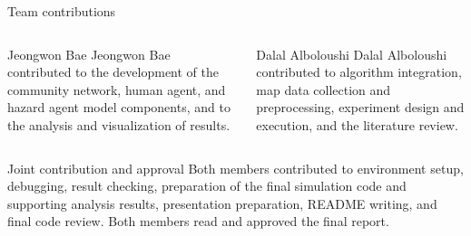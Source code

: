 \documentclass[aspectratio=169, xcolor=table]{beamer}
\begin{document}
\begin{frame}[t]{Team contributions}
\footnotesize

\begin{columns}[T,onlytextwidth]
\begin{block}{\small Jeongwon Bae}
\scriptsize
Jeongwon Bae contributed to the development of the community network, human agent, and hazard agent model components, and to the analysis and visualization of results.
\end{block}

\begin{block}{\small Dalal Alboloushi}
\scriptsize
Dalal Alboloushi contributed to algorithm integration, map data collection and preprocessing, experiment design and execution, and the literature review.
\end{block}
\end{columns}

\vspace{0.8em}
\begin{alertblock}{\small Joint contribution and approval}
\scriptsize
Both members contributed to environment setup, debugging, result checking, preparation of the final simulation code and supporting analysis results, presentation preparation, README writing, and final code review. Both members read and approved the final report.
\end{alertblock}

\end{frame}
\end{document}
